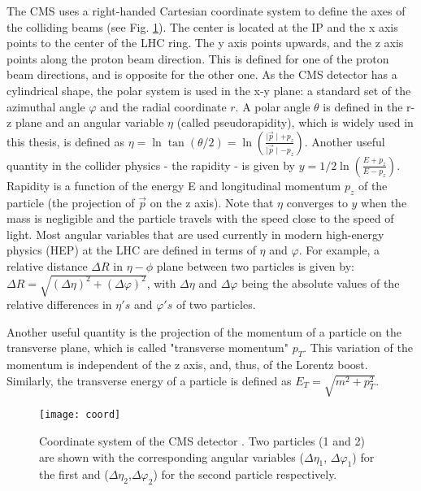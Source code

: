 \begin{normalsize}
The CMS uses a right-handed Cartesian coordinate system to define the axes of the colliding beams (see Fig. \ref{coord}). The center is located at the IP and the x axis points to the center of the LHC ring. The y axis points upwards, and the z axis points along the proton beam direction. This is defined for one of the proton beam directions, and is opposite for the other one. As the CMS detector has a cylindrical shape, the polar system is used in the x-y plane: a standard set of the azimuthal angle $\varphi$ and the radial coordinate $r$. A polar angle $\theta$ is defined in the r-z plane and an angular variable $\eta$ (called pseudorapidity), which is widely used in this thesis, is defined as $\eta = \ln \tan(\theta/2) = \ln (\frac{\mid \vec{p}\mid + p_z}{\mid \vec{p}\mid - p_z})$. Another useful quantity in the collider physics - the rapidity - is given by $y = 1/2 \ln ( \frac{E + p_z}{E - p_z})$. Rapidity is a function of the energy E and longitudinal momentum $p_z$ of the particle (the projection of $\vec{p}$ on the z axis). 
Note that $\eta$ converges to $y$ when the mass is negligible and the particle travels with the speed close to the speed of light. Most angular variables that are used currently in modern high-energy physics (HEP) at the LHC are defined in terms of $\eta$ and $\varphi$. For example, a relative distance $\Delta R$ in $\eta - \phi$ plane between two particles is given by:
$ \Delta R = \sqrt{(\Delta \eta)^2 + (\Delta \varphi)^2}$, with $\Delta \eta$ and $\Delta \varphi$ being the absolute values of the relative differences in $\eta's$ and $\varphi 's$ of two particles. 

Another useful quantity is the projection of the momentum of a particle on the transverse plane, which is called "transverse momentum" $p_T$. This variation of the momentum is independent of the z axis, and, thus, of the Lorentz boost.  Similarly, the transverse energy of a particle is defined as $E_T = \sqrt{m^2 + p_T^2 }$. 





\begin{figure}[H]
  \centering
  \texttt{[image: coord]}
  \caption[Coordinate system of the CMS detector]{Coordinate system of the CMS detector \cite{MonroyMontanez:2639240}. Two particles (1 and 2) are shown with the corresponding angular variables ($\Delta \eta_1$, $\Delta \varphi_1$) for the first and ($\Delta \eta_2$,$ \Delta \varphi_2$) for the second particle respectively.}
  \label{coord}
\end{figure}


\end{normalsize}
